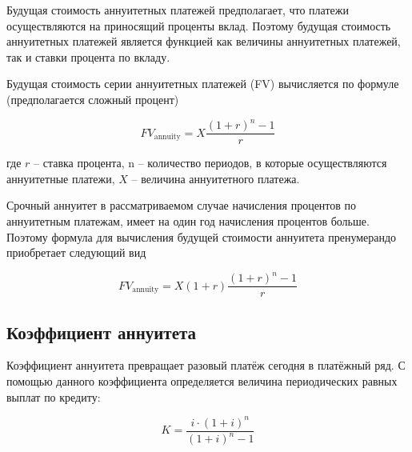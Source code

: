 Будущая стоимость аннуитетных платежей предполагает, что платежи осуществляются на приносящий проценты вклад. Поэтому будущая стоимость аннуитетных платежей является функцией как величины аннуитетных платежей, так и ставки процента по вкладу.

Будущая стоимость серии аннуитетных платежей (FV) вычисляется по формуле (предполагается сложный процент)

$$
FV_\mathrm{annuity} = X \dfrac{(1+r)^n-1}{r} 
$$

где $ r $ -- ставка процента, n -- количество периодов, в которые осуществляются аннуитетные платежи, $ X $ -- величина аннуитетного платежа.

Срочный аннуитет в рассматриваемом случае начисления процентов по аннуитетным платежам, имеет на один год начисления процентов больше. Поэтому формула для вычисления будущей стоимости аннуитета пренумерандо приобретает следующий вид

$$
FV_\mathrm{annuity} = X (1+r) \dfrac{(1+r)^n-1}{r}
$$

\subsection{Коэффициент аннуитета}

Коэффициент аннуитета превращает разовый платёж сегодня в платёжный ряд. С помощью данного коэффициента определяется величина периодических равных выплат по кредиту:

$$
K = \dfrac{i \cdot (1+i)^n}{(1+i)^n -1}
$$